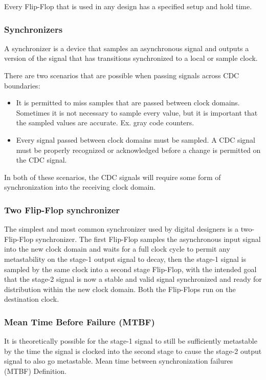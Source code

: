 \par Every Flip-Flop that is used in any design has a specified setup and hold time. 

\subsubsection{Synchronizers}
A synchronizer is a device that samples an asynchronous signal and outputs a version of the signal that has transitions synchronized to a local or sample clock.

\par There are two scenarios that are possible when passing signals across CDC boundaries:
\begin{itemize}
    \item It is permitted to miss samples that are passed between clock domains. Sometimes it is not necessary to sample every value, but it is important that the sampled values are accurate. Ex. gray code counters.
    \item Every signal passed between clock domains must be sampled. A CDC signal must be properly recognized or acknowledged before a change is permitted on the CDC signal.
\end{itemize}
In both of these scenarios, the CDC signals will require some form of synchronization into the receiving clock domain.

\subsubsection{Two Flip-Flop synchronizer}
The simplest and most common synchronizer used by digital designers is a two-Flip-Flop synchronizer. The first Flip-Flop samples the asynchronous input signal into the new clock domain and waits for a full clock cycle to permit any metastability on the stage-1 output signal to decay, then the stage-1 signal is sampled by the same clock into a second stage Flip-Flop, with the intended goal that the stage-2 signal is now a stable and valid signal synchronized and ready for distribution within
the new clock domain. Both the Flip-Flops run on the destination clock.

\subsubsection{Mean Time Before Failure (MTBF)}
It is theoretically possible for the stage-1 signal to still be sufficiently metastable by the time the signal is clocked into the second stage to cause the stage-2 output signal to also go metastable. Mean time between synchronization failures (MTBF) Definition. 


